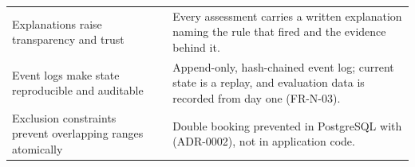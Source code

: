 \begin{longtable}{@{}L{136pt}L{69pt}L{170pt}@{}}
Explanations raise transparency and trust & \cite{zhang2020} & Every assessment carries a written explanation naming the rule that fired and the evidence behind it. \\
Event logs make state reproducible and auditable & \cite{fowler2005es,kleppmann2017} & Append-only, hash-chained event log; current state is a replay, and evaluation data is recorded from day one (FR-N-03). \\
Exclusion constraints prevent overlapping ranges atomically & \cite{postgres16} & Double booking prevented in PostgreSQL with  (ADR-0002), not in application code. \\
\end{longtable}
\endgroup
